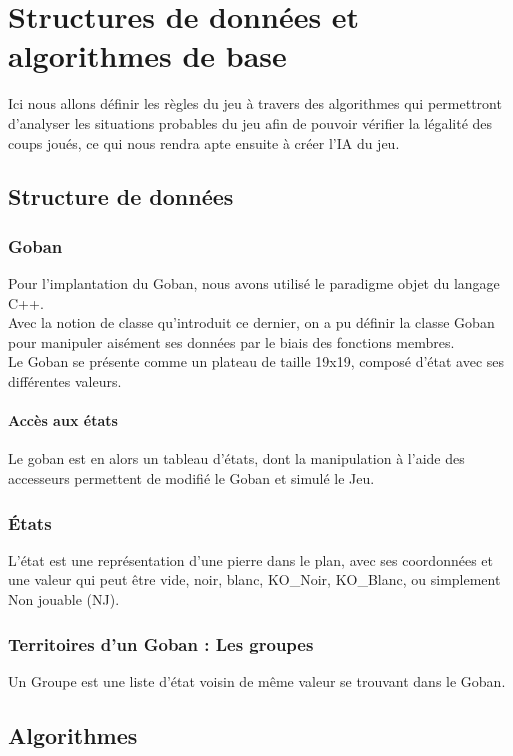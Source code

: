 \chapter{Structures de données et algorithmes de base}\label{chap:moteur}
    Ici nous allons définir les règles du jeu à travers des algorithmes qui permettront d'analyser les situations probables du jeu afin de pouvoir vérifier la légalité des coups joués, ce qui nous rendra apte ensuite à créer l'IA du jeu.
    
    \section{Structure de données}
        \subsection{Goban}
            Pour l'implantation du Goban, nous avons utilisé le paradigme objet du langage C++.\\
            Avec la notion de classe qu'introduit ce dernier, on a pu définir la classe Goban pour manipuler aisément ses données par le biais des fonctions membres.\\ Le Goban se présente comme un plateau de taille 19x19, composé d'état avec ses différentes valeurs.
        \subsubsection{Accès aux états}
            Le goban est en alors un tableau d'états, dont la manipulation à l'aide des accesseurs permettent de  modifié le Goban et simulé le Jeu.
        \subsection{États}
            L'état est une représentation d'une pierre dans le plan, avec ses coordonnées et une valeur qui peut être vide, noir, blanc, KO\_Noir, KO\_Blanc, ou simplement Non jouable (NJ).
        \subsection{Territoires d'un Goban : Les groupes}
            Un Groupe est une liste d'état voisin de même valeur se trouvant dans le Goban.
            
    \section{Algorithmes} 
